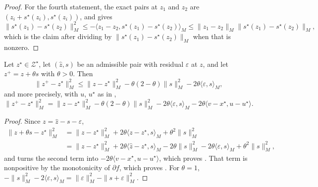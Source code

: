 \documentclass[11pt]{article}
\begin{document}
\begin{proof}
    For the fourth statement, the exact pairs at $z_1$ and $z_2$ are $(z_i + s^\star(z_i), s^\star(z_i))$, and  gives
    \begin{equation*}
        \|s^\star(z_1) - s^\star(z_2)\|_M^2 \leq -\langle z_1 - z_2, s^\star(z_1) - s^\star(z_2)\rangle_M \leq \|z_1 - z_2\|_M \|s^\star(z_1) - s^\star(z_2)\|_M,
    \end{equation*}
    which is the claim after dividing by $\|s^\star(z_1) - s^\star(z_2)\|_M$ when that is nonzero.
\end{proof}

\begin{theorem}\label{thm:lyapunov-inequality}
    Let $z^\star \in \mathcal{Z}^\star$, let $(\hat z, s)$ be an admissible pair with residual $\varepsilon$ at $z$, and let $z^+ = z + \theta s$ with $\theta > 0$.
    Then
    \begin{equation}\label{eq:inexactness-one-step-inequality}
        \|z^{+} - z^\star\|_M^2 \leq \|z - z^\star\|_M^2 - \theta(2-\theta)\|s\|^2_M - 2\theta \langle\varepsilon, s\rangle_M,
    \end{equation}
    and more precisely, with $u$, $u^\star$ as in ,
    \begin{equation}\label{eq:one-step-identity}
        \|z^{+} - z^\star\|_M^2 = \|z - z^\star\|_M^2 - \theta(2-\theta)\|s\|^2_M - 2\theta \langle\varepsilon, s\rangle_M - 2\theta\langle v - x^\star, u - u^\star\rangle.
    \end{equation}
\end{theorem}
\begin{proof}
    Since $z = \hat z - s - \varepsilon$,
    \begin{align}
        \|z + \theta s - z^\star\|_M^2
        &= \|z - z^\star\|_M^2 + 2\theta\langle z - z^\star, s\rangle_M + \theta^2\|s\|_M^2 \\
        &= \|z - z^\star\|_M^2 + 2\theta\langle \hat z - z^\star, s\rangle_M - 2\theta\|s\|_M^2 - 2\theta\langle \varepsilon, s\rangle_M + \theta^2\|s\|_M^2,
    \end{align}
    and  turns the second term into $-2\theta\langle v - x^\star, u - u^\star\rangle$, which proves .
    That term is nonpositive by the monotonicity of $\partial f$, which proves .
    For $\theta = 1$, $-\|s\|_M^2 - 2\langle\varepsilon, s\rangle_M = \|\varepsilon\|_M^2 - \|s + \varepsilon\|_M^2$.
\end{proof}
\end{document}
